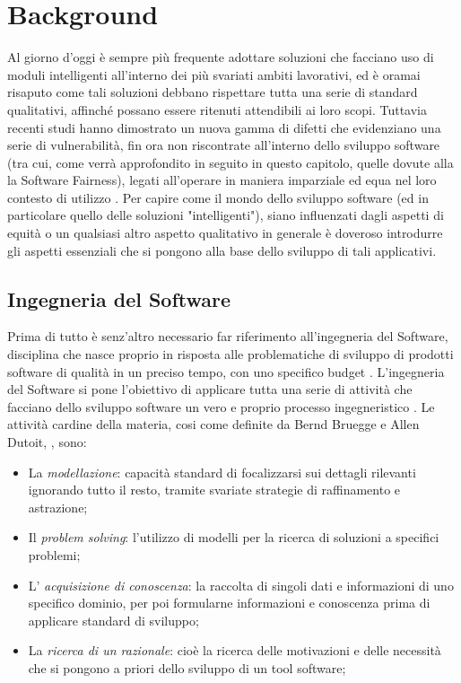 \chapter{Background} %

Al giorno d'oggi è sempre più frequente adottare soluzioni che facciano uso di moduli intelligenti all'interno dei più svariati ambiti lavorativi, ed è oramai risaputo come tali soluzioni debbano rispettare tutta una serie di standard qualitativi, affinché possano essere ritenuti attendibili ai loro scopi. Tuttavia recenti studi hanno dimostrato un nuova gamma di difetti che evidenziano una serie di vulnerabilità, fin ora non riscontrate all'interno dello sviluppo software (tra cui, come verrà approfondito in seguito in questo capitolo, quelle dovute alla la Software Fairness), legati all'operare in maniera imparziale ed equa nel loro contesto di utilizzo \cite{brun2018software}. Per capire come il mondo dello sviluppo software (ed in particolare quello delle soluzioni "intelligenti"), siano influenzati dagli aspetti di equità o un qualsiasi altro aspetto qualitativo in generale è doveroso introdurre gli aspetti essenziali che si pongono alla base dello sviluppo di tali applicativi.

\section{Ingegneria del Software}
Prima di tutto è senz'altro necessario far riferimento all'ingegneria del Software, disciplina che nasce proprio in risposta alle problematiche di sviluppo di prodotti software di qualità in un preciso tempo, con uno specifico budget \cite{Bruegge2009ObjectOrientedSE}. L'ingegneria del Software si pone l'obiettivo di applicare tutta una serie di attività che facciano dello sviluppo software un vero e proprio processo ingegneristico \cite{mall2018fundamentals}.  Le attività cardine della materia, cosi come definite da Bernd Bruegge e Allen Dutoit, \cite{Bruegge2009ObjectOrientedSE}, sono:

\begin{itemize}
    \item La \emph{modellazione}: capacità standard di focalizzarsi sui dettagli rilevanti ignorando tutto il resto, tramite svariate strategie di raffinamento e astrazione;
    \item Il \emph{problem solving}: l'utilizzo di modelli per la ricerca di soluzioni a specifici problemi;
    \item L' \emph{acquisizione di conoscenza}: la raccolta di singoli dati e informazioni di uno specifico dominio, per poi formularne informazioni e conoscenza prima di applicare standard di sviluppo;
    \item La \emph{ricerca di un razionale}: cioè la ricerca delle motivazioni e delle necessità che si pongono a priori dello sviluppo di un tool software;
\end{itemize}

